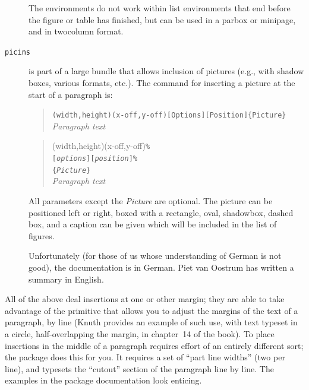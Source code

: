 \begin{description}
    The environments do not work within list environments that end
    before the figure or table has finished, but can be used in a
    parbox or minipage, and in twocolumn format.
  \item[\texttt{picins}]  is part of a large bundle
    that allows inclusion of pictures (e.g., with shadow boxes,
    various \MSDOS{} formats, etc.).  The command for inserting a
    picture at the start of a paragraph is:
\begin{wideversion}
  \begin{quote}
    \texttt{(width,height)(x-off,y-off)[Options][Position]\{Picture\}}\\
    \emph{Paragraph text}
  \end{quote}
\end{wideversion}
\begin{narrowversion}
  \begin{quote}
    (width,height)(x-off,y-off)\texttt{\%}\\
    \mbox{\qquad\qquad}\texttt{[\emph{options}][\emph{position}]\%}\\
    \mbox{\qquad\qquad}\texttt{\{\emph{Picture}\}}\\
    \emph{Paragraph text}
  \end{quote}
\end{narrowversion}  
  All parameters except the \emph{Picture} are optional.  The picture
  can be positioned left or right, boxed with a rectangle, oval,
  shadowbox, dashed box, and a caption can be given which will be
  included in the list of figures.

  Unfortunately (for those of us whose understanding of German is not
  good), the documentation is in German.  Piet van Oostrum has written
  a summary in English.
\end{description}
All of the above deal insertions at one or other margin; they are able
to take advantage of the \tex{}  primitive that allows
you to adjust the margins of the text of a paragraph, by line (Knuth
provides an example of such use, with text typeset in a circle,
half-overlapping the margin, in chapter~14 of the \tex{}book).  To
place insertions in the middle of a paragraph requires effort of an
entirely different sort; the  package does this for
you.  It requires a set of ``part line widths'' (two per line), and
typesets the ``cutout'' section of the paragraph line by line.  The
examples in the package documentation look enticing.

